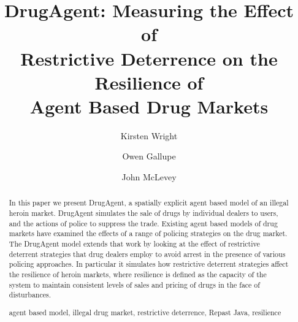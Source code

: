 \documentclass[runningheads,a4paper]{llncs}
\newcommand{\keywords}[1]{\par\addvspace\baselineskip
\noindent\keywordname\enspace\ignorespaces#1}
\begin{document}
\mainmatter  %

\title{DrugAgent: Measuring the Effect of \\Restrictive Deterrence on the Resilience of \\Agent Based Drug Markets}
%
%
\author{Kirsten Wright %
\and Owen Gallupe \and John McLevey}
%




\maketitle


\begin{abstract}

In this paper we present DrugAgent, a spatially explicit agent based model of an illegal heroin market. DrugAgent simulates the sale of drugs by individual dealers to users, and the actions of police to suppress the trade. Existing agent based models of drug markets have examined the effects of a range of policing strategies on the drug market. The DrugAgent model extends that work by looking at the effect of restrictive deterrent strategies that drug dealers employ to avoid arrest in the presence of various policing approaches. In particular it simulates how restrictive deterrent strategies affect the resilience of heroin markets, where resilience is defined as the capacity of the system to maintain consistent levels of sales and pricing of drugs in the face of disturbances.


\keywords{agent based model, illegal drug market, restrictive deterrence, Repast Java, resilience}
\end{abstract}
\end{document}
